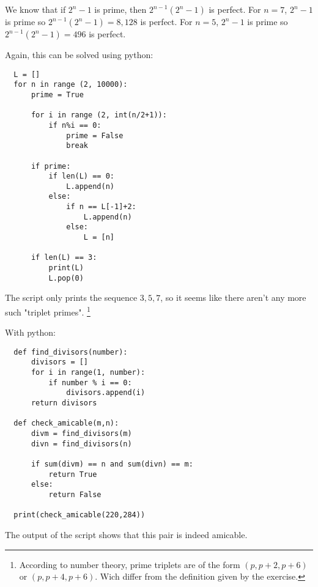 
\sol We know that if $2^n - 1$ is prime, then $2^{n-1}(2^n -1)$ is perfect.
For $n = 7$, $2^n - 1$ is prime so $2^{n-1}(2^n -1) = 8,128$ is perfect.
For $n = 5$, $2^n - 1$ is prime so $2^{n-1}(2^n -1) = 496$ is perfect.

\newpage

\sol Again, this can be solved using python:
\begin{verbatim}
  L = []
  for n in range (2, 10000):
      prime = True

      for i in range (2, int(n/2+1)):
          if n%i == 0:
              prime = False
              break

      if prime:
          if len(L) == 0:
              L.append(n)
          else:
              if n == L[-1]+2:
                  L.append(n)
              else:
                  L = [n]

      if len(L) == 3:
          print(L)
          L.pop(0)
\end{verbatim}
The script only prints the sequence $3, 5, 7$, so it seems like there aren't any more such "triplet primes".
\footnote{
  According to number theory, prime triplets are of the form $(p, p+2, p+6)$ or $(p, p+4, p+6)$.
  Wich differ from the definition given by the exercise.
}


\sol With python:
\begin{verbatim}
  def find_divisors(number):
      divisors = []
      for i in range(1, number):
          if number % i == 0:
              divisors.append(i)
      return divisors

  def check_amicable(m,n):
      divm = find_divisors(m)
      divn = find_divisors(n)

      if sum(divm) == n and sum(divn) == m:
          return True
      else:
          return False

  print(check_amicable(220,284))
\end{verbatim}
The output of the script shows that this pair is indeed amicable.
